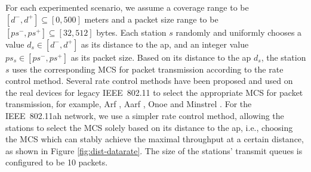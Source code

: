 For each experimented scenario, we assume a coverage range to be $[d^-, d^+]  \subseteq [0, 500] $  meters and a packet size range to be $[ps^-, ps^+] \subseteq [32, 512] $ bytes. Each station $s$ randomly and uniformly chooses a value $d_s \in [d^-, d^+]$ as its distance to the \gls{ap}, and an integer value $ps_s \in [ps^-, ps^+]$ as its packet size. Based on its distance to the \gls{ap} $d_s$, the station $s$ uses the corresponding MCS for packet transmission according to the rate control method. Several rate control methods have been proposed and used on the real devices for legacy IEEE~802.11 to select the appropriate MCS for packet transmission, for example, Arf \cite{arf1997},  Aarf \cite{aarf2004}, Onoe \cite{Onoe} and Minstrel \cite{minstrel}. For the IEEE~802.11ah network, we use a simpler rate control method, allowing the stations to select the MCS solely based on its distance to the \gls{ap}, i.e., choosing the MCS which can stably achieve the maximal throughput at a certain distance, as shown in Figure \ref{fig:dist-datarate}. The size of the stations' transmit queues is configured to be 10 packets. 









